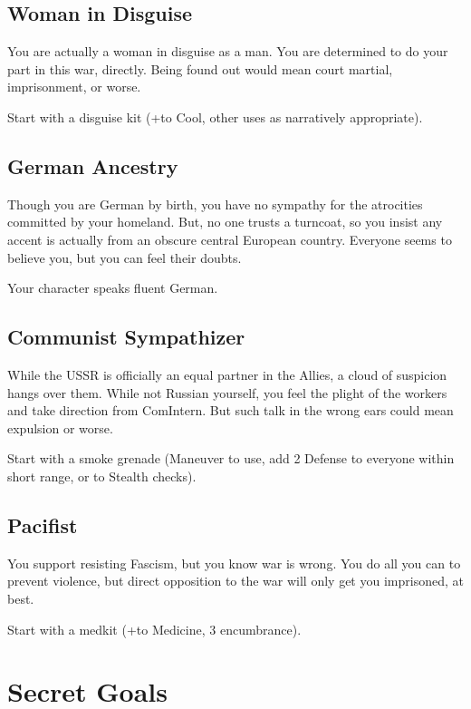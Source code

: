 \documentclass{book}
\newcommand{\bbb}{\BoostDie}
\begin{document}
\begin{multicols}{2}
\subsection{Woman in Disguise}

You are actually a woman in disguise as a man.  You are determined to do your part in this war, directly.  Being found out would mean court martial, imprisonment, or worse.

Start with a disguise kit (+\bbb to Cool, other uses as narratively appropriate).

\subsection{German Ancestry}

Though you are German by birth, you have no sympathy for the atrocities committed by your homeland.  But, no one trusts a turncoat, so you insist any accent is actually from an obscure central European country.  Everyone seems to believe you, but you can feel their doubts.

Your character speaks fluent German.

\subsection{Communist Sympathizer}

While the USSR is officially an equal partner in the Allies, a cloud of suspicion hangs over them.  While not Russian yourself, you feel the plight of the workers and take direction from ComIntern.  But such talk in the wrong ears could mean expulsion or worse.

Start with a smoke grenade (Maneuver to use, add 2 Defense to everyone within short range, or \bbb\bbb to Stealth checks).

\subsection{Pacifist}

You support resisting Fascism, but you know war is wrong.  You do all you can to prevent violence, but direct opposition to the war will only get you imprisoned, at best.

Start with a medkit (+\bbb to Medicine, 3 encumbrance).

\section{Secret Goals}


\end{multicols}
\end{document}

